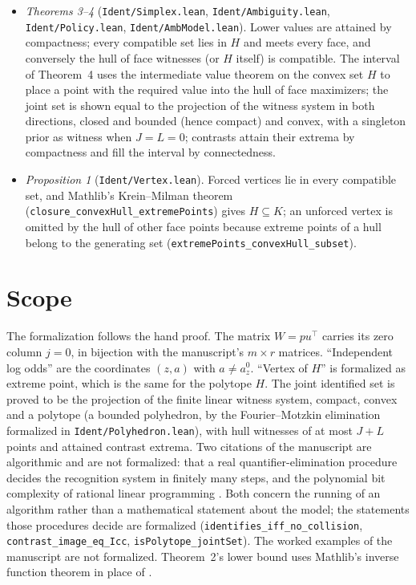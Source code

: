 \documentclass[11pt]{article}
\begin{document}
\begin{itemize}
\item \emph{Theorems 3--4} (\texttt{Ident/Simplex.lean}, \texttt{Ident/Ambiguity.lean}, \texttt{Ident/Policy.lean}, \texttt{Ident/AmbModel.lean}). Lower values are attained by compactness; every compatible set lies in $H$ and meets every face, and conversely the hull of face witnesses (or $H$ itself) is compatible. The interval of Theorem~4 uses the intermediate value theorem on the convex set $H$ to place a point with the required value into the hull of face maximizers; the joint set is shown equal to the projection of the witness system in both directions, closed and bounded (hence compact) and convex, with a singleton prior as witness when $J=L=0$; contrasts attain their extrema by compactness and fill the interval by connectedness.
\item \emph{Proposition 1} (\texttt{Ident/Vertex.lean}). Forced vertices lie in every compatible set, and Mathlib's Krein--Milman theorem (\texttt{closure\_convexHull\_extremePoints}) gives $H\subseteq K$; an unforced vertex is omitted by the hull of other face points because extreme points of a hull belong to the generating set (\texttt{extremePoints\_convexHull\_subset}).
\end{itemize}

\section{Scope}

The formalization follows the hand proof. The matrix $W=pu^\top$ carries its zero column $j=0$, in bijection with the manuscript's $m\times r$ matrices. ``Independent log odds'' are the coordinates $(z,a)$ with $a\ne a^0_z$. ``Vertex of $H$'' is formalized as extreme point, which is the same for the polytope $H$. The joint identified set is proved to be the projection of the finite linear witness system, compact, convex and a polytope (a bounded polyhedron, by the Fourier--Motzkin elimination formalized in \texttt{Ident/Polyhedron.lean}), with hull witnesses of at most $J+L$ points and attained contrast extrema. Two citations of the manuscript are algorithmic and are not formalized: that a real quantifier-elimination procedure \cite{BPR} decides the recognition system in finitely many steps, and the polynomial bit complexity of rational linear programming \cite{BTN}. Both concern the running of an algorithm rather than a mathematical statement about the model; the statements those procedures decide are formalized (\texttt{identifies\_iff\_no\_collision}, \texttt{contrast\_image\_eq\_Icc}, \texttt{isPolytope\_jointSet}). The worked examples of the manuscript are not formalized. Theorem~2's lower bound uses Mathlib's inverse function theorem in place of \cite{Rudin}.
\end{document}
